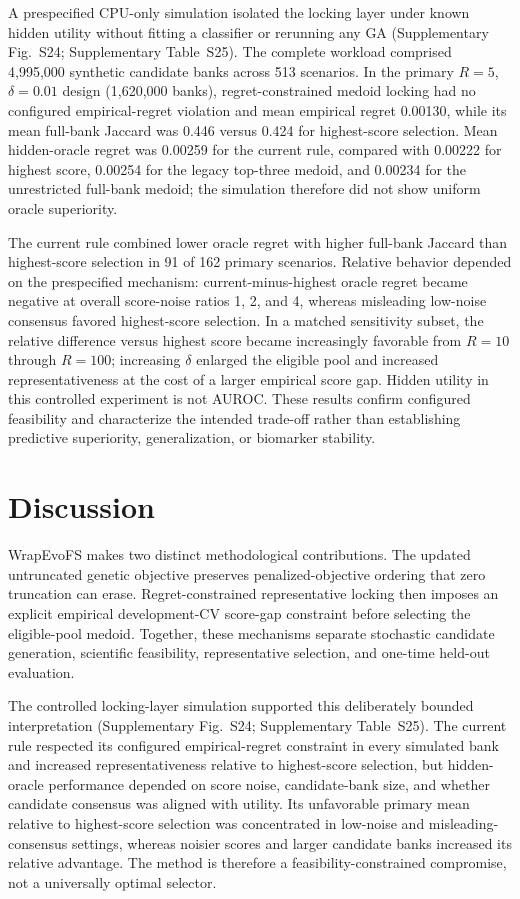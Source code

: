 A prespecified CPU-only simulation isolated the locking layer under known hidden utility without fitting a classifier or rerunning any GA (Supplementary Fig.~S24; Supplementary Table~S25). The complete workload comprised 4,995,000 synthetic candidate banks across 513 scenarios. In the primary $R=5$, $\delta=0.01$ design (1,620,000 banks), regret-constrained medoid locking had no configured empirical-regret violation and mean empirical regret 0.00130, while its mean full-bank Jaccard was 0.446 versus 0.424 for highest-score selection. Mean hidden-oracle regret was 0.00259 for the current rule, compared with 0.00222 for highest score, 0.00254 for the legacy top-three medoid, and 0.00234 for the unrestricted full-bank medoid; the simulation therefore did not show uniform oracle superiority.

The current rule combined lower oracle regret with higher full-bank Jaccard than highest-score selection in 91 of 162 primary scenarios. Relative behavior depended on the prespecified mechanism: current-minus-highest oracle regret became negative at overall score-noise ratios 1, 2, and 4, whereas misleading low-noise consensus favored highest-score selection. In a matched sensitivity subset, the relative difference versus highest score became increasingly favorable from $R=10$ through $R=100$; increasing $\delta$ enlarged the eligible pool and increased representativeness at the cost of a larger empirical score gap. Hidden utility in this controlled experiment is not AUROC. These results confirm configured feasibility and characterize the intended trade-off rather than establishing predictive superiority, generalization, or biomarker stability.

\FloatBarrier
\section{Discussion}

WrapEvoFS makes two distinct methodological contributions. The updated untruncated genetic objective preserves penalized-objective ordering that zero truncation can erase. Regret-constrained representative locking then imposes an explicit empirical development-CV score-gap constraint before selecting the eligible-pool medoid. Together, these mechanisms separate stochastic candidate generation, scientific feasibility, representative selection, and one-time held-out evaluation.

The controlled locking-layer simulation supported this deliberately bounded interpretation (Supplementary Fig.~S24; Supplementary Table~S25). The current rule respected its configured empirical-regret constraint in every simulated bank and increased representativeness relative to highest-score selection, but hidden-oracle performance depended on score noise, candidate-bank size, and whether candidate consensus was aligned with utility. Its unfavorable primary mean relative to highest-score selection was concentrated in low-noise and misleading-consensus settings, whereas noisier scores and larger candidate banks increased its relative advantage. The method is therefore a feasibility-constrained compromise, not a universally optimal selector.

